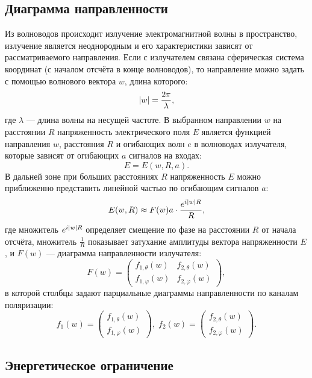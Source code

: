 \subsection{Диаграмма направленности}

Из волноводов происходит излучение электромагнитной волны в пространство, излучение является неоднородным и его характеристики зависят от рассматриваемого направления.
Если с излучателем связана сферическая система координат (с началом отсчёта в конце волноводов), то направление можно задать с помощью волнового вектора $w$,
длина которого:
\[
    \left | w \right | = \frac{2 \pi}{\lambda},
\]
где $\lambda$ --- длина волны на несущей частоте. В выбранном направлении $w$ на расстоянии $R$ напряженность электрического поля $E$ является функцией
направления $w$, расстояния $R$ и огибающих волн $e$ в волноводах излучателя, которые зависят от огибающих $a$ сигналов на входах:
\[
    E = E(w, R, a).
\]
В дальней зоне при больших расстояниях $R$ напряженность $E$ можно приближенно представить линейной частью по огибающим сигналов $a$:
\begin{equation}
    \label{emission:emitter:diagram:tension}
    E(w,R)
    \approx F(w) a \cdot \frac{e^{i \left | w \right | R}}{R} ,
\end{equation}
где множитель $e^{i \left | w \right | R}$ определяет смещение по фазе на расстоянии $R$ от начала отсчёта, множитель $\frac{1}{R}$ показывает затухание амплитуды
вектора напряженности $E$, и $F(w)$ --- диаграмма направленности излучателя:
\[
    F(w)
    = \begin{pmatrix}
          f_{1, \theta}(w)  & f_{2, \theta}(w)  \\
          f_{1, \varphi}(w) & f_{2, \varphi}(w)
    \end{pmatrix} ,
\]
в которой столбцы задают парциальные диаграммы направленности по каналам поляризации:
\begin{equation}
    f_1(w)
    = \begin{pmatrix}
          f_{1,\theta}(w) \\
          f_{1,\varphi}(w)
    \end{pmatrix}
    , \;
    f_2(w)
    = \begin{pmatrix}
          f_{2,\theta}(w) \\
          f_{2,\varphi}(w)
    \end{pmatrix}
    \label{emission:emitter:diagram:partial}
    .
\end{equation}

\subsection{Энергетическое ограничение}

